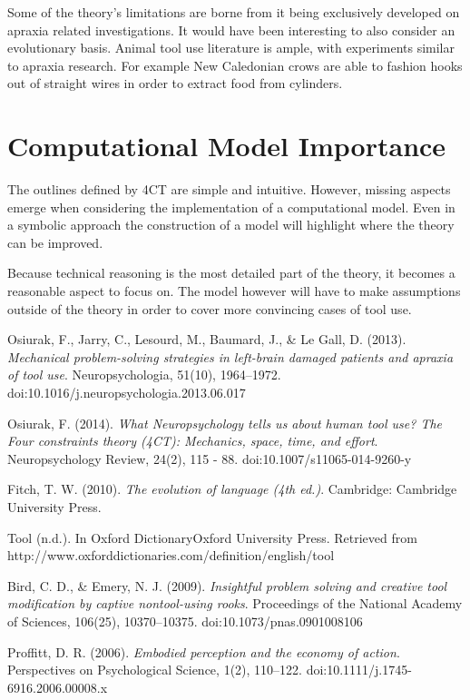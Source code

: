 \documentclass[11]{article}
\begin{document}
Some of the theory's limitations are borne from it being exclusively developed on apraxia related investigations. It would have been interesting to also consider an evolutionary basis. Animal tool use literature is ample, with experiments similar to apraxia research. For example New Caledonian crows are able to fashion hooks out of straight wires in order to extract food from cylinders\cite{bettyCrow2009}. 

\section{Computational Model Importance}
The outlines defined by 4CT are simple and intuitive. However, missing aspects emerge when considering the implementation of a computational model. Even in a symbolic approach the construction of a model will highlight where the theory can be improved. 

Because technical reasoning is the most detailed part of the theory, it becomes a reasonable aspect to focus on. The model however will have to make assumptions outside of the theory in order to cover more convincing cases of tool use. 

\begin{thebibliography}{9}
Osiurak, F., Jarry, C., Lesourd, M., Baumard, J., \& Le Gall, D. (2013). \emph{Mechanical problem-solving strategies in left-brain damaged patients and apraxia of tool use}. Neuropsychologia, 51(10), 1964–1972.
doi:10.1016/j.neuropsychologia.2013.06.017

Osiurak, F. (2014). \emph{What Neuropsychology tells us about human tool use? The Four constraints theory (4CT): Mechanics, space, time, and effort}. Neuropsychology Review, 24(2), 115 - 88. doi:10.1007/s11065-014-9260-y


Fitch, T. W. (2010). \emph{The evolution of language (4th ed.)}. Cambridge: Cambridge University Press.

Tool (n.d.). In Oxford DictionaryOxford University Press. Retrieved from http://www.oxforddictionaries.com/definition/english/tool

Bird, C. D., \& Emery, N. J. (2009). \emph{Insightful problem solving and creative tool modification by captive nontool-using rooks}. Proceedings of the National Academy of Sciences, 106(25), 10370–10375. doi:10.1073/pnas.0901008106

Proffitt, D. R. (2006). \emph{Embodied perception and the economy of action}. Perspectives on Psychological Science, 1(2), 110–122. doi:10.1111/j.1745-6916.2006.00008.x

\end{thebibliography}
\end{document}
